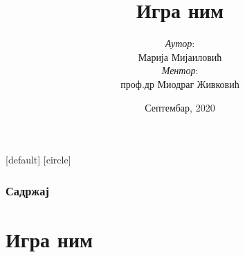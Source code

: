 \documentclass[10pt]{beamer}
\title[Игра ним]{
	{\huge Игра ним}
}
\begin{document}
\author[Марија Мијаиловић]{	
	{
		\parbox{0.45\textwidth}
			{\raggedright \textit{Аутор}:\\Марија Мијаиловић}
			\hfill
		\parbox{0.45\textwidth}
		{\raggedleft \textit{Ментор}:\\проф.др Миодраг Живковић}
	}
}


\date{{\scriptsize{Септембар, 2020}}}

\begin{noheadline}
\begin{frame}\maketitle\end{frame}
\end{noheadline}

[default]
[circle]

\begin{frame}
	\frametitle{Садржај} %
	\tableofcontents %
\end{frame}

\section{Игра ним}
\end{document}
